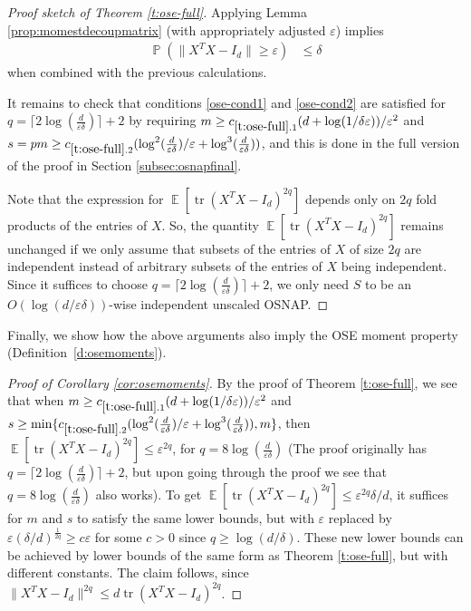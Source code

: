 \documentclass[11pt]{amsart}
\numberwithin{equation}{section}
\numberwithin{equation}{section}
\DeclareMathOperator{\E}{\mathbb{E}}
\DeclareMathOperator{\Pb}{\mathbb{P}}
\DeclareMathOperator*{\tr}{tr}
\theoremstyle{remark}
\theoremstyle{definition}
\begin{document}
\begin{proof}[Proof sketch of Theorem \ref{t:ose-full}]
Applying Lemma \ref{prop:momestdecoupmatrix} (with appropriately adjusted $\varepsilon$) implies
\begin{align*}
        \Pb \left( \| X^TX - I_d \| \ge \varepsilon \right) &\le \delta
    \end{align*}
when combined with the previous calculations.

It remains to check that conditions \eqref{ose-cond1} and \eqref{ose-cond2} are satisfied for $q = \lceil 2\log (\frac{d}{\varepsilon \delta} )\rceil+2$ by requiring $m \ge c_{\ref*{t:ose-full}.1}  (d + \log(1/\delta\varepsilon))/\varepsilon^2$ and $s = pm \geq c_{\ref*{t:ose-full}.2} (\log ^2(\frac{d}{\varepsilon\delta})/\varepsilon+\log^3(\frac{d}{\varepsilon\delta}))$, and this is done in the full version of the proof in Section \ref{subsec:osnapfinal}. 

Note that the expression for $\E[\tr(X^TX - I_d)^{2q}]$ depends only on $2q$ fold products of the entries of $X$. So, the quantity $\E[\tr(X^TX - I_d)^{2q}]$ remains unchanged if we only assume that subsets of the entries of $X$ of size $2q$ are independent instead of arbitrary subsets of the entries of $X$ being independent. Since it suffices to choose $q=\lceil 2\log (\frac{d}{\varepsilon \delta} )\rceil+2$, we only need $S$ to be an $O(\log(d/\varepsilon\delta))$-wise independent unscaled OSNAP.
\end{proof}
Finally, we show how the above arguments also imply the OSE moment property (Definition~\ref{d:osemoments}).
\begin{proof}[Proof of Corollary \ref{cor:osemoments}]
    By the proof of Theorem \ref{t:ose-full}, we see that when  $m \ge c_{\ref*{t:ose-full}.1}  (d + \log(1/\delta\varepsilon))/\varepsilon^2$ and  $s \ge \min\{c_{\ref*{t:ose-full}.2} (\log ^2(\frac{d}{\varepsilon\delta})/\varepsilon+\log^3(\frac{d}{\varepsilon\delta})),m\}$, then $\E[\tr(X^TX - I_d)^{2q}] \le \varepsilon^{2q}$, for $q=8\log(\frac{d}{\varepsilon \delta})$ (The proof originally has $q = \lceil 2\log (\frac{d}{\varepsilon \delta} )\rceil+2$, but upon going through the proof we see that $q=8\log(\frac{d}{\varepsilon \delta})$ also works). To get $\E[\tr(X^TX - I_d)^{2q}] \le \varepsilon^{2q}\delta/d$, it suffices for $m$ and $s$ to satisfy the same lower bounds, but with $\varepsilon$ replaced by $\varepsilon (\delta/d)^\frac{1}{2q} \ge c \varepsilon$ for some $c>0$ since $q \ge \log(d/\delta)$. These new lower bounds can be achieved by lower bounds of the same form as Theorem \ref{t:ose-full}, but with different constants. The claim follows, since $\|X^TX- I_d\|^{2q}\leq d\tr(X^TX-I_d)^{2q}$.
\end{proof}
\end{document}
